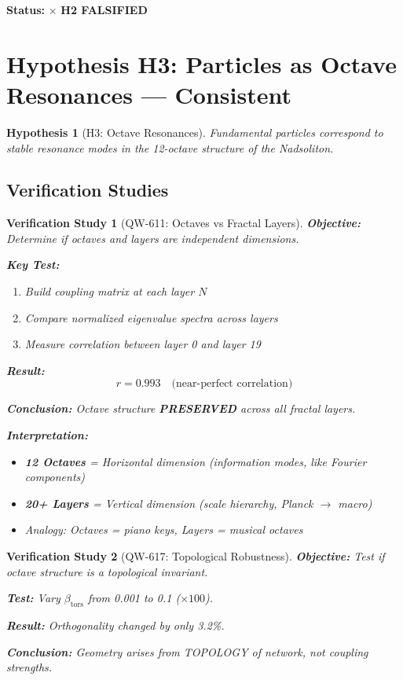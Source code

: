 \documentclass[11pt,a4paper]{book}
\newtheorem{hypothesis}{Hypothesis}[section]
\newtheorem{verification}{Verification Study}[section]
\theoremstyle{remark}
\newcommand{\betators}{\beta_{\text{tors}}}
\begin{document}
\textbf{Status:} $\times$ \textbf{H2 FALSIFIED}

\section{Hypothesis H3: Particles as Octave Resonances --- Consistent}

\begin{hypothesis}[H3: Octave Resonances]
Fundamental particles correspond to stable resonance modes in the 12-octave structure of the Nadsoliton.
\end{hypothesis}

\subsection{Verification Studies}

\begin{verification}[QW-611: Octaves vs Fractal Layers]
\textbf{Objective:} Determine if octaves and layers are independent dimensions.

\textbf{Key Test:}
\begin{enumerate}
    \item Build coupling matrix at each layer $N$
    \item Compare normalized eigenvalue spectra across layers
    \item Measure correlation between layer 0 and layer 19
\end{enumerate}

\textbf{Result:}
\begin{equation}
r = 0.993 \quad \text{(near-perfect correlation)}
\end{equation}

\textbf{Conclusion:} Octave structure \textbf{PRESERVED} across all fractal layers.

\textbf{Interpretation:}
\begin{itemize}
    \item \textbf{12 Octaves} = Horizontal dimension (information modes, like Fourier components)
    \item \textbf{20+ Layers} = Vertical dimension (scale hierarchy, Planck $\to$ macro)
    \item Analogy: Octaves = piano keys, Layers = musical octaves
\end{itemize}
\end{verification}

\begin{verification}[QW-617: Topological Robustness]
\textbf{Objective:} Test if octave structure is a topological invariant.

\textbf{Test:} Vary $\betators$ from 0.001 to 0.1 ($\times 100$).

\textbf{Result:} Orthogonality changed by only 3.2\%.

\textbf{Conclusion:} Geometry arises from TOPOLOGY of network, not coupling strengths.
\end{verification}
\end{document}
